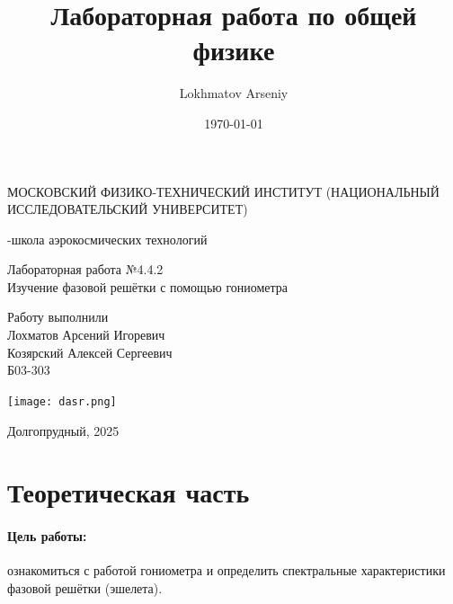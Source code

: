 \documentclass[a4paper,12pt]{article} %
\author{Lokhmatov Arseniy}
\title{Лабораторная работа по общей физике}
\date{\today}
\begin{document}
\begin{titlepage}
    \newpage
    \begin{center}
    {\large МОСКОВСКИЙ ФИЗИКО-ТЕХНИЧЕСКИЙ ИНСТИТУТ (НАЦИОНАЛЬНЫЙ ИССЛЕДОВАТЕЛЬСКИЙ УНИВЕРСИТЕТ)}
    \vspace{1cm}

    {-школа аэрокосмических технологий}
    \vspace{6em}
    \end{center}
    
    \vspace{1.2em}

    \begin{center}
    \Large Лабораторная работа №4.4.2 \\
    Изучение фазовой решётки с помощью гониометра
    \linebreak
    \end{center}
    
    \vspace{11em}
    
    \begin{flushright}
                       {\large Работу выполнили\\
                       Лохматов Арсений Игоревич\\
                       Козярский Алексей Сергеевич\\
                       Б03-303 }
    \end{flushright}

    \vspace{\fill}

    \begin{center}
        \texttt{[image: dasr.png]}
    \end{center}

    \begin{center}
    Долгопрудный, 2025
    \end{center}

    \end{titlepage}

\section{Теоретическая часть}


\paragraph{Цель работы: } ознакомиться с работой гониометра и определить спектральные характеристики фазовой решётки (эшелета).
\end{document}
